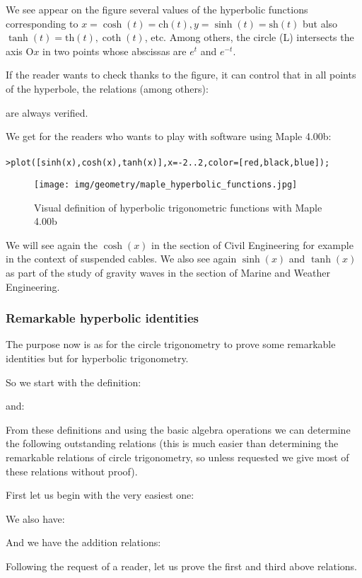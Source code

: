 	We see appear on the figure several values of the hyperbolic functions corresponding to $x=\cosh(t)=\text{ch}(t),y=\sinh(t)=\text{sh}(t)$ but also $\tanh(t)=\text{th}(t),\coth(t)$, etc. Among others, the circle (L) intersects the axis $\text{O}x$ in two points whose abscissas are $e^t$ and $e^{-t}$.
	
	If the reader wants to check thanks to the figure, it can control that in all points of the  hyperbole, the relations (among others):
	
	are always verified.
	
	We get for the readers who wants to play with software using Maple 4.00b:\\\\
		\texttt{>plot([sinh(x),cosh(x),tanh(x)],x=-2..2,color=[red,black,blue]);}
	
	\begin{figure}[H]
	\centering
	\texttt{[image: img/geometry/maple\_hyperbolic\_functions.jpg]}
	\caption{Visual definition of hyperbolic trigonometric functions with Maple 4.00b}
	\end{figure}
	We will see again the $\cosh(x)$ in the section of Civil Engineering for example in the context of suspended cables. We also see again $\sinh (x)$ and $\tanh (x)$ as part of the study of gravity waves in the section of Marine and Weather Engineering.
	
	\subsubsection{Remarkable hyperbolic identities}
	
	The purpose now is as for the circle trigonometry to prove some remarkable identities but for hyperbolic trigonometry.
	
	So we start with the definition:
	
	and:
	
	From these definitions and using the basic algebra operations we can determine the following outstanding relations (this is much easier than determining the remarkable relations of circle trigonometry, so unless requested we give most of these relations without proof).
	
	First let us begin with the very easiest one:
	
	We also have:
	
	And we have the addition relations:
	
	Following the request of a reader, let us prove the first and third above relations.
	
